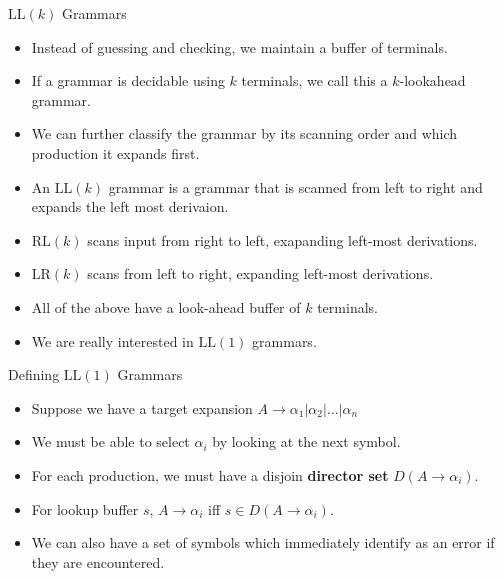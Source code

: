 \documentclass[]{beamer}
\begin{document}
\begin{frame}{$\mathrm{LL}(k)$ Grammars}
  \begin{itemize}[<+->]
    \item Instead of guessing and checking, we maintain a buffer of terminals.
    \item If a grammar is decidable using $k$ terminals, we call this a $k$-lookahead grammar.
    \item We can further classify the grammar by its scanning order and which production it expands first.
    \item An $\mathrm{LL}(k)$ grammar is a grammar that is scanned from left to right and expands the left most derivaion.
    \item $\mathrm{RL}(k)$ scans input from right to left, exapanding left-most derivations.
    \item $\mathrm{LR}(k)$ scans from left to right, expanding left-most derivations.
    \item All of the above have a look-ahead buffer of $k$ terminals.
    \item We are really interested in $\mathrm{LL}(1)$ grammars.
  \end{itemize}
\end{frame}

\begin{frame}{Defining $\mathrm{LL}(1)$ Grammars}
  \begin{itemize}[<+->]
      \item Suppose we have a target expansion $A \rightarrow \alpha_1 | \alpha_2 | \ldots | \alpha_n$
      \item We must be able to select $\alpha_i$ by looking at the next symbol.
      \item For each production, we must have a disjoin \textbf{director set} $D(A\rightarrow \alpha_i)$.
      \item For lookup buffer $s$, $A \rightarrow \alpha_i$ iff $s \in D(A \rightarrow \alpha_i)$.
      \item We can also have a set of symbols which immediately identify as an error if they are encountered.
  \end{itemize}
\end{frame}
\end{document}
